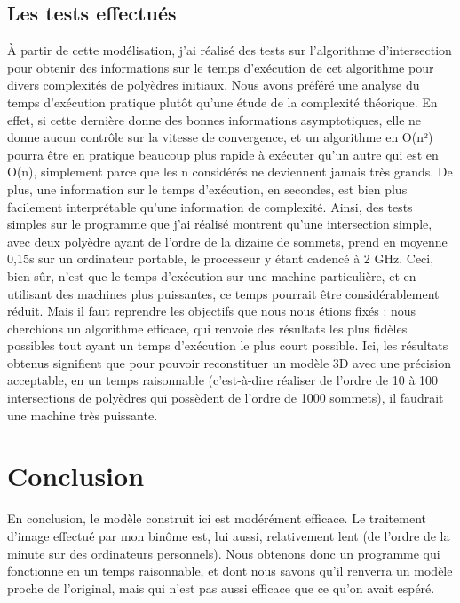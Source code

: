 \documentclass[a4paper]{article}
\begin{document}
      \subsection{Les tests effectués}
        \`A partir de cette modélisation, j’ai réalisé des tests sur l’algorithme d’intersection pour obtenir des informations sur le temps d’exécution de cet algorithme pour divers complexités de polyèdres initiaux. Nous avons préféré une analyse du temps d’exécution pratique plutôt qu’une étude de la complexité théorique. En effet, si cette dernière donne des bonnes informations asymptotiques, elle ne donne aucun contrôle sur la vitesse de convergence, et un algorithme en O(n²) pourra être en pratique beaucoup plus rapide à exécuter qu’un autre qui est en O(n), simplement parce que les n considérés ne deviennent jamais très grands. De plus, une information sur le temps d’exécution, en secondes, est bien plus facilement interprétable qu’une information de complexité. Ainsi, des tests simples sur le programme que j’ai réalisé montrent qu’une intersection simple, avec deux polyèdre ayant de l’ordre de la dizaine de sommets, prend en moyenne 0,15s sur un ordinateur portable, le processeur y étant cadencé à 2 GHz. Ceci, bien sûr, n’est que le temps d’exécution sur une machine particulière, et en utilisant des machines plus puissantes, ce temps pourrait être considérablement réduit. Mais il faut reprendre les objectifs que nous nous étions fixés : nous cherchions un algorithme efficace, qui renvoie des résultats les plus fidèles possibles tout ayant un temps d’exécution le plus court possible. Ici, les résultats obtenus signifient que pour pouvoir reconstituer un modèle 3D avec une précision acceptable, en un temps raisonnable (c’est-à-dire réaliser de l’ordre de 10 à 100 intersections de polyèdres qui possèdent de l’ordre de 1000 sommets), il faudrait une machine très puissante.

    \section{Conclusion}
      En conclusion, le modèle construit ici est modérément efficace. Le traitement d’image effectué par mon binôme est, lui aussi, relativement lent (de l’ordre de la minute sur des ordinateurs personnels). Nous obtenons donc un programme qui fonctionne en un temps raisonnable, et dont nous savons qu’il renverra un modèle proche de l’original, mais qui n’est pas aussi efficace que ce qu’on avait espéré.


  \appendix
\end{document}
